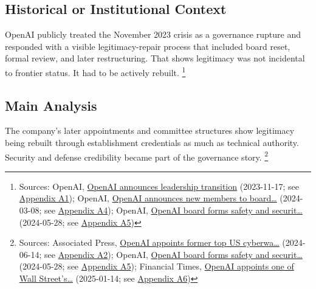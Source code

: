 \documentclass[
  american,
  11pt,
  letterpaper,
]{article}
\begin{document}
\subsection{Historical or Institutional
Context}\label{historical-or-institutional-context-8}

OpenAI publicly treated the November 2023 crisis as a governance rupture
and responded with a visible legitimacy-repair process that included
board reset, formal review, and later restructuring. That shows
legitimacy was not incidental to frontier status. It had to be actively
rebuilt. \footnote{Sources: OpenAI,
  \href{https://openai.com/index/openai-announces-leadership-transition/}{OpenAI
  announces leadership transition} (2023-11-17; see
  \hyperref[ch-08-appendix-a1-openai-announces-leadership-transition]{Appendix
  A1}); OpenAI,
  \href{https://openai.com/index/openai-announces-new-members-to-board-of-directors/}{OpenAI
  announces new members to board\ldots{}} (2024-03-08; see
  \hyperref[ch-08-appendix-a4-openai-announces-new-members-to-board-of-directors]{Appendix
  A4}); OpenAI,
  \href{https://openai.com/index/openai-board-forms-safety-and-security-committee/}{OpenAI
  board forms safety and securit\ldots{}} (2024-05-28; see
  \hyperref[ch-08-appendix-a5-openai-board-forms-safety-and-security-committee]{Appendix
  A5})}

\subsection{Main Analysis}\label{main-analysis-8}

The company's later appointments and committee structures show
legitimacy being rebuilt through establishment credentials as much as
technical authority. Security and defense credibility became part of the
governance story. \footnote{Sources: Associated Press,
  \href{https://apnews.com/article/6ef612a3a0fcaef05480bbd1ebbd79b1}{OpenAI
  appoints former top US cyberwa\ldots{}} (2024-06-14; see
  \hyperref[ch-08-appendix-a2-openai-appoints-former-top-us-cyberwarrior-paul-nakasone-to-its-board-of-directors]{Appendix
  A2}); OpenAI,
  \href{https://openai.com/index/openai-board-forms-safety-and-security-committee/}{OpenAI
  board forms safety and securit\ldots{}} (2024-05-28; see
  \hyperref[ch-08-appendix-a5-openai-board-forms-safety-and-security-committee]{Appendix
  A5}); Financial Times,
  \href{https://www.ft.com/content/63b08a9d-e537-4d60-9904-c59958a16982}{OpenAI
  appoints one of Wall Street's\ldots{}} (2025-01-14; see
  \hyperref[ch-08-appendix-a6-openai-appoints-one-of-wall-street-s-most-powerful-dealmakers-to-its-board]{Appendix
  A6})}
\end{document}
